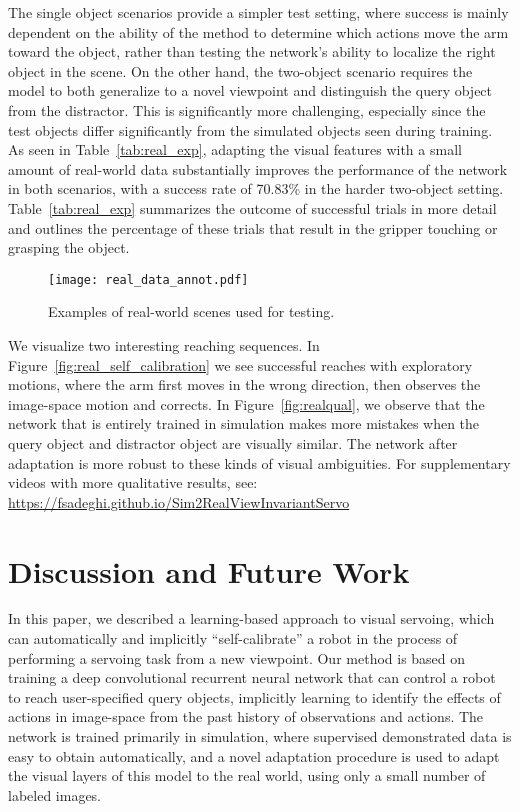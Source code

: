 \documentclass[10pt,twocolumn,letterpaper]{article}
\begin{document}
The single object scenarios provide a simpler test setting, where success is mainly dependent on the ability of the method to determine which actions move the arm toward the object, rather than testing the network's ability to localize the right object in the scene. On the other hand, the two-object scenario requires the model to both generalize to a novel viewpoint and distinguish the query object from the distractor. This is significantly more challenging, especially since the test objects differ significantly from the simulated objects seen during training. As seen in Table~\ref{tab:real_exp}, adapting the visual features with a small amount of real-world data substantially improves the performance of the network in both scenarios, with a success rate of 70.83\% in the harder two-object setting. Table~\ref{tab:real_exp} summarizes the outcome of successful trials in more detail and outlines the percentage of these trials that result in the gripper touching or grasping the object.

\begin{figure}[t]
\begin{center}
\texttt{[image: real\_data\_annot.pdf]}
\end{center}
\vspace{-.15in}
\caption{Examples of real-world scenes used for testing.}
\label{fig:realdata}
\vspace{-.2in}
\end{figure} We visualize two interesting reaching sequences. In Figure~\ref{fig:real_self_calibration} we see successful reaches with exploratory motions, where the arm first moves in the wrong direction, then observes the image-space motion and corrects. In Figure~\ref{fig:realqual}, we observe that the network that is entirely trained in simulation makes more mistakes when the query object and distractor object are visually similar. The network after adaptation is more robust to these kinds of visual ambiguities. For supplementary videos with more qualitative results, see: \href{https://fsadeghi.github.io/Sim2RealViewInvariantServo}{https://fsadeghi.github.io/Sim2RealViewInvariantServo}

\section{Discussion and Future Work}
In this paper, we described a learning-based approach to visual servoing, which can automatically and implicitly ``self-calibrate'' a robot in the process of performing a servoing task from a new viewpoint. Our method is based on training a deep convolutional recurrent neural network that can control a robot to reach user-specified query objects, implicitly learning to identify the effects of actions in image-space from the past history of observations and actions. The network is trained primarily in simulation, where supervised demonstrated data is easy to obtain automatically, and a novel adaptation procedure is used to adapt the visual layers of this model to the real world, using only a small number of labeled images.
\end{document}
